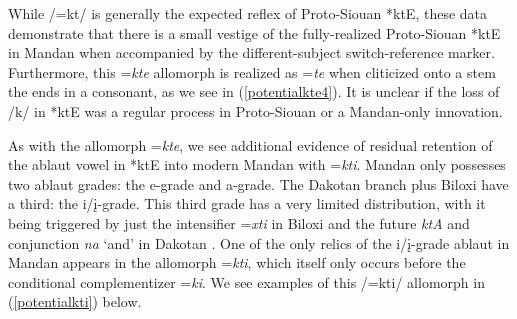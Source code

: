 While /=kt/ is generally the expected reflex of Proto-Siouan *ktE, these data demonstrate that there is a small vestige of the fully-realized Proto-Siouan *ktE in Mandan when accompanied by the different-subject switch-reference marker. Furthermore, this =\textit{kte} allomorph is realized as =\textit{te} when cliticized onto a stem the ends in a consonant, as we see in (\ref{potentialkte4}). It is unclear if the loss of /k/ in *ktE was a regular process in Proto-Siouan or a Mandan-only innovation.

\label{allomorphkti}

As with the allomorph =\textit{kte}, we see additional evidence of residual retention of the ablaut vowel in *ktE into modern Mandan with =\textit{kti}. Mandan only possesses two ablaut grades: the e-grade and a-grade. The Dakotan branch plus Biloxi have a third: the i/į-grade. This third grade has a very limited distribution, with it being triggered by just the intensifier =\textit{xti} in Biloxi and the future \textit{ktA} and conjunction \textit{na} `and' in Dakotan \citep[29]{jones1983b}. One of the only relics of the i/į-grade ablaut in Mandan appears in the allomorph =\textit{kti}, which itself only occurs before the conditional complementizer =\textit{ki}. We see examples of this /=kti/ allomorph in (\ref{potentialkti}) below.

